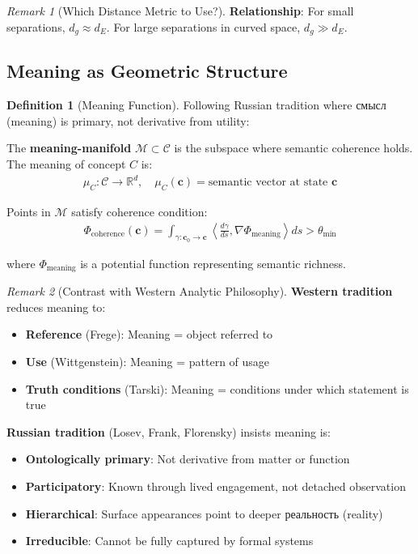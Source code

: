 \documentclass[11pt,a4paper]{article}
\theoremstyle{definition}
\newtheorem{definition}{Definition}[section]
\theoremstyle{remark}
\newtheorem{remark}{Remark}[section]
\newcommand{\RR}{\mathbb{R}}
\newcommand{\CC}{\mathcal{C}}
\newcommand{\cc}{\mathbf{c}}
\begin{document}
\begin{small}
\begin{remark}[Which Distance Metric to Use?]
\textbf{Relationship}: For small separations, \(d_g \approx d_E\). For large separations in curved space, \(d_g \gg d_E\).
\end{remark}

\subsection{Meaning as Geometric Structure}

\begin{definition}[Meaning Function]
Following Russian tradition where смысл (meaning) is primary, not derivative from utility:

The \textbf{meaning-manifold} \(\mathcal{M} \subset \CC\) is the subspace where semantic coherence holds. The meaning of concept \(C\) is:
\begin{align}
\mu_C: \CC \rightarrow \RR^d, \quad \mu_C(\cc) = \text{semantic vector at state } \cc
\end{align}

Points in \(\mathcal{M}\) satisfy coherence condition:
\begin{align}
\Phi_{\text{coherence}}(\cc) = \int_{\gamma: \cc_0 \to \cc} \left\langle \frac{d\gamma}{ds}, \nabla \Phi_{\text{meaning}} \right\rangle ds > \theta_{\min}
\end{align}

where \(\Phi_{\text{meaning}}\) is a potential function representing semantic richness.
\end{definition}

\begin{remark}[Contrast with Western Analytic Philosophy]
\textbf{Western tradition} reduces meaning to:
\begin{itemize}
    \item \textbf{Reference} (Frege): Meaning = object referred to
    \item \textbf{Use} (Wittgenstein): Meaning = pattern of usage
    \item \textbf{Truth conditions} (Tarski): Meaning = conditions under which statement is true
\end{itemize}

\textbf{Russian tradition} (Losev, Frank, Florensky) insists meaning is:
\begin{itemize}
\item \textbf{Ontologically primary}: Not derivative from matter or function
\item \textbf{Participatory}: Known through lived engagement, not detached observation
\item \textbf{Hierarchical}: Surface appearances point to deeper реальность (reality)
\item \textbf{Irreducible}: Cannot be fully captured by formal systems
\end{itemize}


\end{remark}
\end{small}
\end{document}
